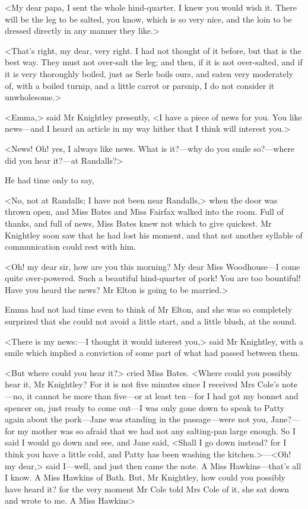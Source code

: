 <My dear papa, I sent the whole hind-quarter. I knew you would wish it. There will be the leg to be salted, you know, which is so very nice, and the loin to be dressed directly in any manner they like.>

<That's right, my dear, very right. I had not thought of it before, but that is the best way. They must not over-salt the leg; and then, if it is not over-salted, and if it is very thoroughly boiled, just as Serle boils ours, and eaten very moderately of, with a boiled turnip, and a little carrot or parsnip, I do not consider it unwholesome.>

<Emma,> said Mr Knightley presently, <I have a piece of news for you. You like news—and I heard an article in my way hither that I think will interest you.>

<News! Oh! yes, I always like news. What is it?—why do you smile so?—where did you hear it?—at Randalls?>

He had time only to say,

<No, not at Randalls; I have not been near Randalls,> when the door was thrown open, and Miss Bates and Miss Fairfax walked into the room. Full of thanks, and full of news, Miss Bates knew not which to give quickest. Mr Knightley soon saw that he had lost his moment, and that not another syllable of communication could rest with him.

<Oh! my dear sir, how are you this morning? My dear Miss Woodhouse—I come quite over-powered. Such a beautiful hind-quarter of pork! You are too bountiful! Have you heard the news? Mr Elton is going to be married.>

Emma had not had time even to think of Mr Elton, and she was so completely surprized that she could not avoid a little start, and a little blush, at the sound.

<There is my news:—I thought it would interest you,> said Mr Knightley, with a smile which implied a conviction of some part of what had passed between them.

<But where could you hear it?> cried Miss Bates. <Where could you possibly hear it, Mr Knightley? For it is not five minutes since I received Mrs Cole's note—no, it cannot be more than five—or at least ten—for I had got my bonnet and spencer on, just ready to come out—I was only gone down to speak to Patty again about the pork—Jane was standing in the passage—were not you, Jane?—for my mother was so afraid that we had not any salting-pan large enough. So I said I would go down and see, and Jane said, <Shall I go down instead? for I think you have a little cold, and Patty has been washing the kitchen.>—<Oh! my dear,> said I—well, and just then came the note. A Miss Hawkins—that's all I know. A Miss Hawkins of Bath. But, Mr Knightley, how could you possibly have heard it? for the very moment Mr Cole told Mrs Cole of it, she sat down and wrote to me. A Miss Hawkins\longdash>

